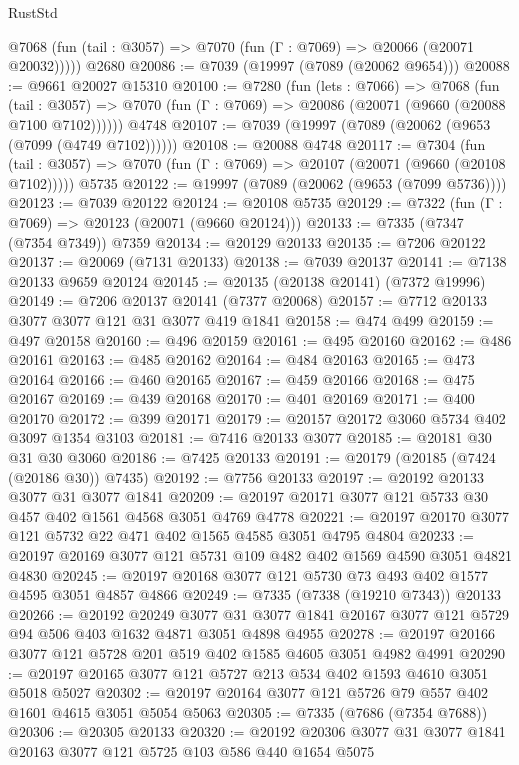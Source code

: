 \begin{lexlean}{RustStd}
\begin{coremodule}
      @7068 (fun (tail : @3057) => @7070 (fun (Γ : @7069) => @20066 (@20071 @20032)))))
    @2680
@20086 := @7039 (@19997 (@7089 (@20062 @9654)))
@20088 := @9661 @20027 @15310
@20100 := @7280
    (fun (lets : @7066) =>
    @7068
      (fun (tail : @3057) =>
      @7070 (fun (Γ : @7069) => @20086 (@20071 (@9660 (@20088 @7100 @7102))))))
    @4748
@20107 := @7039 (@19997 (@7089 (@20062 (@9653 (@7099 (@4749 @7102))))))
@20108 := @20088 @4748
@20117 := @7304
    (fun (tail : @3057) => @7070 (fun (Γ : @7069) => @20107 (@20071 (@9660 (@20108 @7102)))))
    @5735
@20122 := @19997 (@7089 (@20062 (@9653 (@7099 @5736))))
@20123 := @7039 @20122
@20124 := @20108 @5735
@20129 := @7322 (fun (Γ : @7069) => @20123 (@20071 (@9660 @20124)))
@20133 := @7335 (@7347 (@7354 @7349)) @7359
@20134 := @20129 @20133
@20135 := @7206 @20122
@20137 := @20069 (@7131 @20133)
@20138 := @7039 @20137
@20141 := @7138 @20133 @9659 @20124
@20145 := @20135 (@20138 @20141) (@7372 @19996)
@20149 := @7206 @20137 @20141 (@7377 @20068)
@20157 := @7712 @20133 @3077 @3077 @121 @31 @3077 @419 @1841
@20158 := @474 @499
@20159 := @497 @20158
@20160 := @496 @20159
@20161 := @495 @20160
@20162 := @486 @20161
@20163 := @485 @20162
@20164 := @484 @20163
@20165 := @473 @20164
@20166 := @460 @20165
@20167 := @459 @20166
@20168 := @475 @20167
@20169 := @439 @20168
@20170 := @401 @20169
@20171 := @400 @20170
@20172 := @399 @20171
@20179 := @20157 @20172 @3060 @5734 @402 @3097 @1354 @3103
@20181 := @7416 @20133 @3077
@20185 := @20181 @30 @31 @30 @3060
@20186 := @7425 @20133
@20191 := @20179 (@20185 (@7424 (@20186 @30)) @7435)
@20192 := @7756 @20133
@20197 := @20192 @20133 @3077 @31 @3077 @1841
@20209 := @20197 @20171 @3077 @121 @5733 @30 @457 @402 @1561 @4568 @3051 @4769 @4778
@20221 := @20197 @20170 @3077 @121 @5732 @22 @471 @402 @1565 @4585 @3051 @4795 @4804
@20233 := @20197 @20169 @3077 @121 @5731 @109 @482 @402 @1569 @4590 @3051 @4821 @4830
@20245 := @20197 @20168 @3077 @121 @5730 @73 @493 @402 @1577 @4595 @3051 @4857 @4866
@20249 := @7335 (@7338 (@19210 @7343)) @20133
@20266 := @20192
    @20249
    @3077
    @31
    @3077
    @1841
    @20167
    @3077
    @121
    @5729
    @94
    @506
    @403
    @1632
    @4871
    @3051
    @4898
    @4955
@20278 := @20197 @20166 @3077 @121 @5728 @201 @519 @402 @1585 @4605 @3051 @4982 @4991
@20290 := @20197 @20165 @3077 @121 @5727 @213 @534 @402 @1593 @4610 @3051 @5018 @5027
@20302 := @20197 @20164 @3077 @121 @5726 @79 @557 @402 @1601 @4615 @3051 @5054 @5063
@20305 := @7335 (@7686 (@7354 @7688))
@20306 := @20305 @20133
@20320 := @20192 @20306 @3077 @31 @3077 @1841 @20163 @3077 @121 @5725 @103 @586 @440 @1654 @5075

\end{coremodule}
\end{lexlean}
